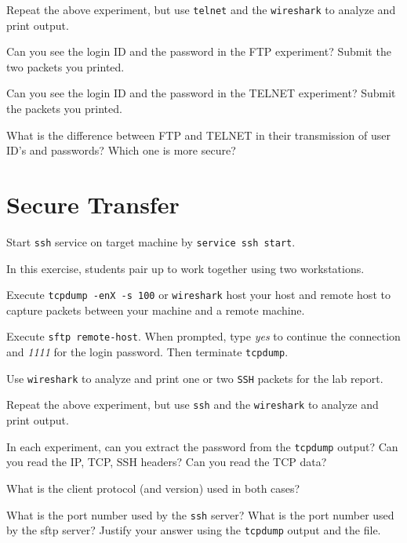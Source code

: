 \documentclass{../UTNetLab}
\begin{document}
    Repeat the above experiment, but use \lstinline{telnet} and the \lstinline{wireshark} to analyze and print output.

    \begin{report}
    \item Can you see the login ID and the password in the FTP experiment? Submit the two packets you printed.
    
    \item Can you see the login ID and the password in the TELNET experiment? Submit the packets you printed.
    
    \item What is the difference between FTP and TELNET in their transmission of user ID’s and passwords? Which one is more secure?
    \end{report}

\section{Secure Transfer}
    Start \lstinline{ssh} service on target machine by \lstinline{service ssh start}.

        In this exercise, students pair up to work together using two workstations.
    
    Execute \lstinline{tcpdump -enX -s 100} or \lstinline{wireshark} host your host and remote host to capture packets between your machine and a remote machine.

    Execute \lstinline[emph={your-host, remote-host}]{sftp remote-host}. When prompted, type \textit{yes} to continue the connection and \textit{1111} for the login password. Then terminate \lstinline{tcpdump}.

    Use \lstinline{wireshark} to analyze and print one or two \lstinline{SSH} packets for the lab report.

    Repeat the above experiment, but use \lstinline{ssh} and the \lstinline{wireshark} to analyze and print output.

    \begin{report}
    \item In each experiment, can you extract the password from the \lstinline{tcpdump} output? Can you read the IP, TCP, SSH headers? Can you read the TCP data?
    
    \item What is the client protocol (and version) used in both cases?
    
    \item What is the port number used by the \lstinline{ssh} server? What is the port number used by the sftp server? Justify your answer using the \lstinline{tcpdump} output and the  file.
    \end{report}
\end{document}
